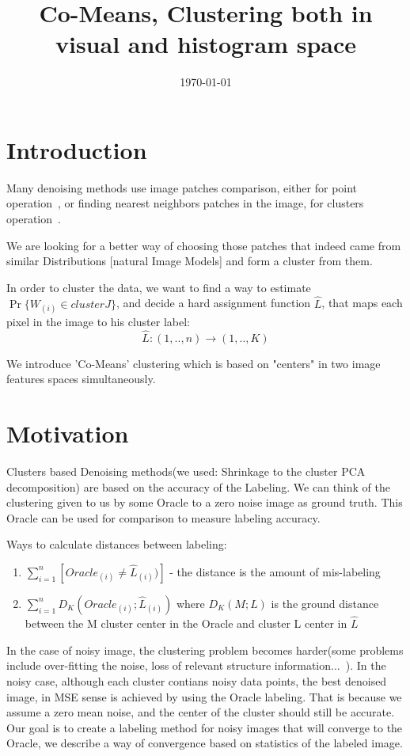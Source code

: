 \documentclass{article}
\title{Co-Means, Clustering both in visual and histogram space}
\author{}
\date{\today}
\begin{document}
\maketitle

\section{Introduction}
Many denoising methods use image patches comparison, either for point operation~\cite{BM3Dipol}, or finding nearest neighbors patches in the image, for clusters operation~\cite{nonlocalmeans}.

We are looking for a better way of choosing those patches that indeed came from similar Distributions [natural Image Models] and form a cluster from them.

In order to cluster the data, we want to find a way to estimate $ \Pr\{W_{(i)}\in cluster J \}$, and decide a hard assignment function $ \widehat{L} $, that maps each pixel in the image to his cluster label:
\begin{equation}
\hat L :(1,..,n)\rightarrow (1,..,K)
\end{equation}

We introduce 'Co-Means' clustering which is based on "centers" in two image features spaces simultaneously.


\section{Motivation}
Clusters based Denoising methods(we used: Shrinkage to the  cluster PCA decomposition) are based on the accuracy of the Labeling.
We can think of the clustering given to us by some Oracle to a zero noise image as ground truth. This Oracle can be used for comparison to measure labeling accuracy. 


Ways to calculate distances between labeling:
\begin{enumerate}
	\item $ \sum_{i=1}^{n} [Oracle_{(i)}\ne\hat{L}_{(i)})]$  - the distance is the amount of mis-labeling
	\item $ \sum_{i=1}^{n} D_K(Oracle_{(i)};\hat{L}_{(i)}) $ where $ D_K(M;L) $ is the ground distance between the M cluster center in the Oracle and cluster L center in $ \hat{L} $
\end{enumerate}

In the case of noisy image, the clustering problem becomes harder(some problems include over-fitting the noise, loss of relevant structure information...~\cite{IraniInterExt}). In the noisy case, although each cluster contians noisy data points, the best denoised image, in MSE sense is achieved by using the Oracle labeling. That is because we assume a zero mean noise, and the center of the cluster should still be accurate.
Our goal is to create a labeling method for noisy images that will converge to the Oracle, we describe a way of convergence based on statistics of the labeled image.
\end{document}
